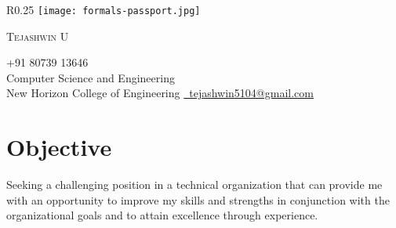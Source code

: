 \documentclass[letterpaper,11pt]{article}
\begin{document}
    
    {
        \begin{wrapfigure}{R}{0.25\textwidth}
            \vspace{-18pt}\hfill\texttt{[image: formals-passport.jpg]} 
        \end{wrapfigure}
    

    {{\Huge \scshape Tejashwin U}  \\ \vspace{-10pt}
    \begin{itemize}[leftmargin=0.08in, label={}]
        \small{\item{
        {\small +91 80739 13646 ~ } \\ \vspace{2pt}
        {Computer Science and Engineering}
         \vspace{2pt} \\
        {New Horizon College of Engineering} { \hspace{200pt}\href{mailto:tejashwin5104@gmail.com}{\raisebox{-0.2\height}\faEnvelope\  \underline{tejashwin5104@gmail.com}} ~}	 \\	 \vspace{4pt}  
        \vspace{2pt}
        }}
    \end{itemize}}
}




\section{Objective}
    \begin{itemize}[leftmargin=0.08in, label={}]
        {\item{
         {Seeking a challenging position in a technical organization that can provide me with an opportunity to improve my skills and strengths in conjunction with the organizational goals and to attain excellence through experience.}
    }}
    \end{itemize}
   
\end{document}

